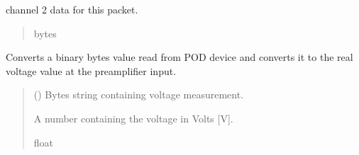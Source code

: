 \documentclass[letterpaper,10pt,english]{sphinxmanual}
\begin{document}
\begin{fulllineitems}
\begin{fulllineitems}
\begin{quote}
\begin{description}
\end{description}\end{quote}

\end{fulllineitems}


\begin{fulllineitems}
\label{\detokenize{Morelia.Packets:Morelia.Packets.Binary4.PacketBinary4.ch2}}
\pysigstartsignatures
{}
\pysigstopsignatures
\sphinxAtStartPar
channel 2 data for this packet.
\begin{quote}\begin{description}
\sphinxAtStartPar
bytes

\end{description}\end{quote}

\end{fulllineitems}


\begin{fulllineitems}
\label{\detokenize{Morelia.Packets:Morelia.Packets.Binary4.PacketBinary4.BinaryBytesToVoltage}}
\pysigstartsignatures
{}
\pysigstopsignatures
\sphinxAtStartPar
Converts a binary bytes value read from POD device and converts it to the         real voltage value at the preamplifier input.
\begin{quote}\begin{description}
\sphinxAtStartPar
{} () \textendash{} Bytes string containing voltage measurement.

\sphinxAtStartPar
A number containing the voltage in Volts {[}V{]}.

\sphinxAtStartPar
float


\end{description}
\end{quote}
\end{fulllineitems}
\end{fulllineitems}
\end{document}
